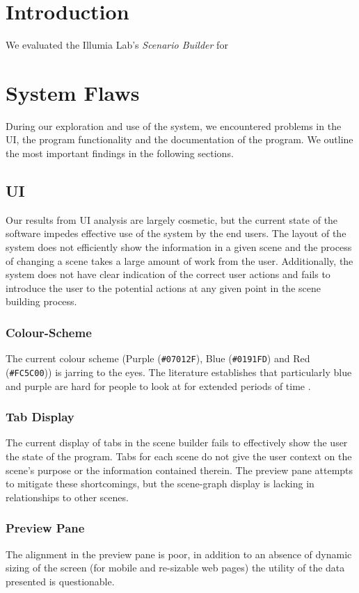 \documentclass[sigconf]{acmart}
\begin{document}
\section{Introduction}
We evaluated the Illumia Lab's \textit{Scenario Builder} for
\section{System Flaws}
During our exploration and use of the system, we encountered problems in the UI, the program functionality and the documentation of the program. We outline the most important findings in the following sections.
\subsection{UI}
Our results from UI analysis are largely cosmetic, but the current state of the software impedes effective use of the system by the end users. The layout of the system does not efficiently show the information in a given scene and the process of changing a scene takes a large amount of work from the user. Additionally, the system does not have clear indication of the correct user actions and fails to introduce the user to the potential actions at any given point in the scene building process.

\subsubsection{Colour-Scheme}
The current colour scheme (Purple (\verb|#07012F|), Blue (\verb|#0191FD|) and Red (\verb|#FC5C00|)) is jarring to the eyes. The literature establishes that particularly blue and purple are hard for people to look at for extended periods of time \cite{HCI-Dev}.

\subsubsection{Tab Display}
The current display of tabs in the scene builder fails to effectively show the user the state of the program. Tabs for each scene do not give the user context on the scene's purpose or the information contained therein. The preview pane attempts to mitigate these shortcomings, but the scene-graph display is lacking in relationships to other scenes.

\subsubsection{Preview Pane}
The alignment in the preview pane is poor, in addition to an absence of dynamic sizing of the screen (for mobile and re-sizable web pages) the utility of the data presented is questionable.
\end{document}

